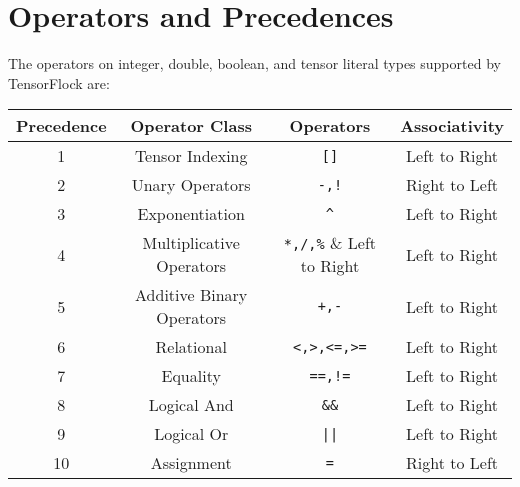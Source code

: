 \section{Operators and Precedences}%
\label{sec:operators_and_precedences}

The operators on integer, double, boolean, and tensor literal types
supported by TensorFlock are:

\begin{center}
\begin{tabular}{ |c|c|c|c| } 
 \hline
 Precedence & Operator Class & Operators & Associativity\\ 
 \hline
 1 & Tensor Indexing & \verb|[]| & Left to Right\\
 \hline
 2 & Unary Operators & \verb|-,!| & Right to Left \\
 \hline
 3 & Exponentiation & \verb|^| & Left to Right\\
 \hline
 4 & Multiplicative Operators & \verb|*,/,%| & Left to Right\\
 \hline
 5 & Additive Binary Operators & \verb|+,-| & Left to Right\\
 \hline
 6 & Relational & \verb|<,>,<=,>=| & Left to Right\\
 \hline
 7 & Equality & \verb|==,!=| & Left to Right\\
 \hline
 8 & Logical And & \verb|&&| & Left to Right\\
 \hline
 9 & Logical Or & \verb!||! & Left to Right\\
 \hline
 10 & Assignment & \verb|=| & Right to Left\\
 \hline
\end{tabular}
\end{center}

